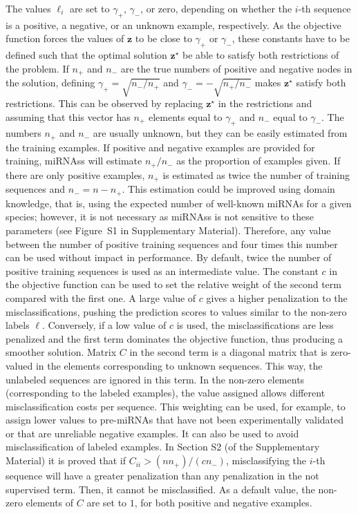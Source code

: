 \documentclass{article}
\newcommand*\Bell{\ensuremath{\boldsymbol\ell}}
\begin{document}
The values $\ell_{i}$ are set to $\gamma_{+}$, $\gamma_{-}$, or zero, depending on whether the $i$-th sequence is a positive, a negative, or an unknown example, respectively. As the objective function forces the values of $\mathbf{z}$ to be close to $\gamma_{+}$ or $\gamma_{-}$, these constants have to be defined such that the optimal solution $\mathbf{z}^\star$ be able to satisfy both restrictions of the problem. If $n_{+}$ and $n_{-}$ are the true numbers of positive and negative nodes in the solution, defining $\gamma_{+} = \sqrt{n_{-} / n_{+}}$ and $\gamma_{-} = - \sqrt{n_{+} / n_{-}}$ makes $\mathbf{z}^\star$ satisfy both restrictions. This can be observed by replacing $\mathbf{z}^\star$ in the restrictions and assuming that this vector has $n_{+}$ elements equal to $\gamma_{+}$ and $n_{-}$ equal to $\gamma_{-}$. The numbers $n_{+}$ and $n_{-}$ are usually unknown, but they can be easily estimated from the training examples. If positive and negative examples are provided for training, miRNAss will estimate $n_{+}/n_{-}$ as the proportion of examples given. If there are only positive examples, $n_{+}$ is estimated as twice the number of training sequences and $n_{-} = n - n_{+}$. This estimation could be improved using domain knowledge, that is, using the expected number of well-known miRNAs for a given species; however, it is not necessary as miRNAss is not sensitive to these parameters (see Figure~S1 in Supplementary Material). Therefore, any value between the number of positive training sequences and four times this number can be used without impact in performance. By default, twice the number of positive training sequences is used as an intermediate value.
The constant $c$ in the objective function can be used to set the relative weight of the second term compared with the first one. A large value of $c$ gives a higher penalization to the misclassifications, pushing the prediction scores to values similar to the non-zero labels $\Bell$. Conversely, if a low value of $c$ is used, the misclassifications are less penalized and the first term dominates the objective function, thus producing a smoother solution. Matrix $C$ in the second term is a diagonal matrix that is zero-valued in the elements corresponding to unknown sequences. This way, the unlabeled sequences are ignored in this term. In the non-zero elements (corresponding to the labeled examples), the value assigned allows different misclassification costs per sequence. This weighting can be used, for example, to assign lower values to pre-miRNAs that have not been experimentally validated or that are unreliable negative examples. It can also be used to avoid misclassification of labeled examples. In Section S2 (of the Supplementary Material) it is proved that if $C_{ii} > (n n_{+}) / (c n_{-})$, misclassifying the $i$-th sequence will have a greater penalization than any penalization in the not supervised term. Then, it cannot be misclassified. As a default value, the non-zero elements of $C$ are set to $1$, for both positive and negative examples.
\end{document}
